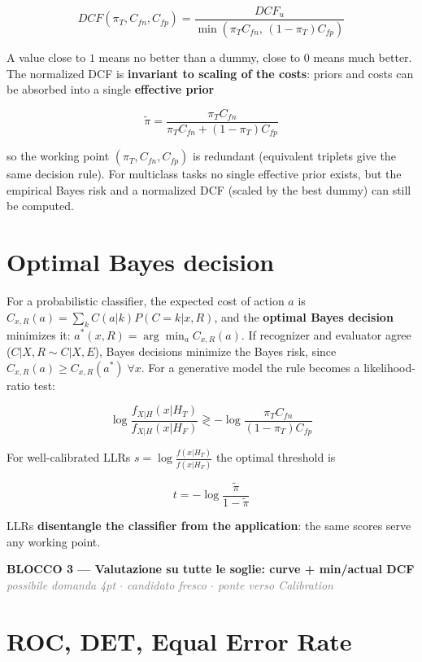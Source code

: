 $$DCF(\pi_T, C_{fn}, C_{fp}) = \frac{DCF_u}{\min(\pi_T C_{fn},\,(1-\pi_T)C_{fp})}$$

A value close to $1$ means no better than a dummy, close to $0$ means much better. The normalized DCF is \textbf{invariant to scaling of the costs}: priors and costs can be absorbed into a single \textbf{effective prior}

$$\tilde{\pi} = \frac{\pi_T C_{fn}}{\pi_T C_{fn} + (1-\pi_T)C_{fp}}$$

so the working point $(\pi_T, C_{fn}, C_{fp})$ is redundant (equivalent triplets give the same decision rule). For multiclass tasks no single effective prior exists, but the empirical Bayes risk and a normalized DCF (scaled by the best dummy) can still be computed.

\section*{Optimal Bayes decision}

For a probabilistic classifier, the expected cost of action $a$ is $C_{x,R}(a) = \sum_k C(a|k) P(C=k|x,R)$, and the \textbf{optimal Bayes decision} minimizes it: $a^*(x,R) = \arg\min_a C_{x,R}(a)$. If recognizer and evaluator agree ($C|X,R \sim C|X,E$), Bayes decisions minimize the Bayes risk, since $C_{x,R}(a) \ge C_{x,R}(a^*)\;\forall x$. For a generative model the rule becomes a likelihood-ratio test:

$$\log\frac{f_{X|H}(x|H_T)}{f_{X|H}(x|H_F)} \gtrless -\log\frac{\pi_T C_{fn}}{(1-\pi_T)C_{fp}}$$

For well-calibrated LLRs $s = \log\frac{f(x|H_T)}{f(x|H_F)}$ the optimal threshold is

$$t = -\log\frac{\tilde{\pi}}{1-\tilde{\pi}}$$

LLRs \textbf{disentangle the classifier from the application}: the same scores serve any working point.

\begin{tcolorbox}[colback=green!6, colframe=green!45!black, sharp corners, boxrule=1pt, left=2mm, right=2mm, top=1mm, bottom=1mm, enhanced, breakable]
\textbf{\textcolor{green!45!black}{BLOCCO 3 --- Valutazione su tutte le soglie: curve + min/actual DCF}} \hfill \textcolor{gray}{\footnotesize\textit{possibile domanda 4pt $\cdot$ candidato fresco $\cdot$ ponte verso Calibration}}
\end{tcolorbox}

\section*{ROC, DET, Equal Error Rate}

